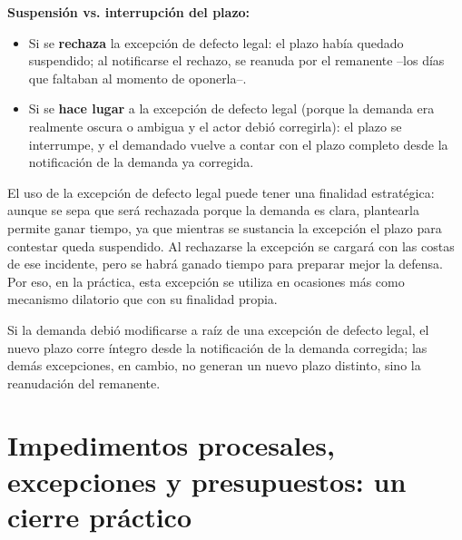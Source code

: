 \documentclass[12pt,oneside]{book}
\begin{document}
\begin{important}
\textbf{Suspensión vs. interrupción del plazo:}
\begin{itemize}
    \item Si se \textbf{rechaza} la excepción de defecto legal: el plazo había quedado suspendido; al notificarse el rechazo, se reanuda por el remanente --los días que faltaban al momento de oponerla--.
    \item Si se \textbf{hace lugar} a la excepción de defecto legal (porque la demanda era realmente oscura o ambigua y el actor debió corregirla): el plazo se interrumpe, y el demandado vuelve a contar con el plazo completo desde la notificación de la demanda ya corregida.
\end{itemize}
\end{important}

\begin{note}
El uso de la excepción de defecto legal puede tener una finalidad estratégica: aunque se sepa que será rechazada porque la demanda es clara, plantearla permite ganar tiempo, ya que mientras se sustancia la excepción el plazo para contestar queda suspendido. Al rechazarse la excepción se cargará con las costas de ese incidente, pero se habrá ganado tiempo para preparar mejor la defensa. Por eso, en la práctica, esta excepción se utiliza en ocasiones más como mecanismo dilatorio que con su finalidad propia.

\end{note}

Si la demanda debió modificarse a raíz de una excepción de defecto legal, el nuevo plazo corre íntegro desde la notificación de la demanda corregida; las demás excepciones, en cambio, no generan un nuevo plazo distinto, sino la reanudación del remanente.

\section{Impedimentos procesales, excepciones y presupuestos: un cierre práctico}
\end{document}

